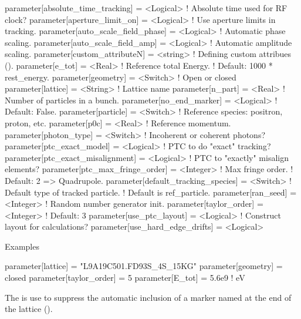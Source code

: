 \begin{example}
  parameter[absolute_time_tracking]   = <Logical>  ! Absolute time used for RF clock?
  parameter[aperture_limit_on]        = <Logical>  ! Use aperture limits in tracking.
  parameter[auto_scale_field_phase]   = <Logical>  ! Automatic phase scaling.
  parameter[auto_scale_field_amp]     = <Logical>  ! Automatic amplitude scaling.
  parameter[custom_attributeN]        = <string>   ! Defining custom attribues ().
  parameter[e_tot]                    = <Real>     ! Reference total Energy. 
                                                   !      Default: 1000 * rest_energy.
  parameter[geometry]                 = <Switch>   ! Open or closed
  parameter[lattice]                  = <String>   ! Lattice name 
  parameter[n_part]                   = <Real>     ! Number of particles in a bunch.
  parameter[no_end_marker]            = <Logical>  ! Default: False.
  parameter[particle]                 = <Switch>   ! Reference species: positron, proton, etc.
  parameter[p0c]                      = <Real>     ! Reference momentum.
  parameter[photon_type]              = <Switch>   ! Incoherent or coherent photons?
  parameter[ptc_exact_model]          = <Logical>  ! PTC to do "exact" tracking?
  parameter[ptc_exact_misalignment]   = <Logical>  ! PTC to "exactly" misalign elements?
  parameter[ptc_max_fringe_order]     = <Integer>  ! Max fringe order. 
                                                   !    Default: 2 => Quadrupole.
  parameter[default_tracking_species] = <Switch>   ! Default type of tracked particle. 
                                                   !    Default is ref_particle.
  parameter[ran_seed]                 = <Integer>  ! Random number generator init.
  parameter[taylor_order]             = <Integer>  ! Default: 3
  parameter[use_ptc_layout]           = <Logical>  ! Construct layout for calculations?
  parameter[use_hard_edge_drifts]     = <Logical>
\end{example}

\noindent
Examples
\begin{example}
  parameter[lattice]      = "L9A19C501.FD93S_4S_15KG"
  parameter[geometry]     = closed
  parameter[taylor_order] = 5
  parameter[E_tot]        = 5.6e9    ! eV
\end{example}

The  is use to suppress the automatic inclusion
of a marker named  at the end of the lattice (). 

